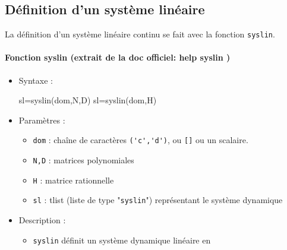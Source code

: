 \subsection{Définition d'un système linéaire}
La définition d'un système linéaire continu se fait avec la fonction 
\verb?syslin?. 
\begin{doc}
\paragraph{Fonction syslin (extrait de la doc officiel: help syslin )}
    \begin{itemize}
        \item Syntaxe :
        \begin{Scilabcode}
sl=syslin(dom,N,D)
sl=syslin(dom,H)
        \end{Scilabcode}
        \item Paramètres :
            \begin{itemize}
                \item \verb?dom? : chaîne de caractères \verb?('c','d')?, 
                      ou \verb?[]? ou un scalaire.
                \item \verb?N,D? : matrices polynomiales
                \item \verb?H?   : matrice rationnelle
                \item \verb?sl?  : tlist (liste de type "\verb?syslin?") 
                      représentant le système dynamique
            \end{itemize}
        \item Description : 
            \begin{itemize}
                \item \verb?syslin? définit un système dynamique linéaire en 

\end{itemize}
\end{itemize}
\end{doc}
